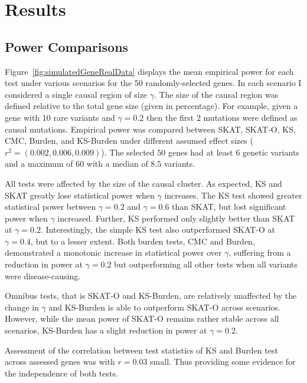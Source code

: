 \section{Results}
\label{sec:results_ksburden}

\subsection{Power Comparisons}
\label{sub:power_comparisons}

Figure~\ref{fig:simulatedGeneRealData} displays the mean empirical power for each test under various scenarios for the 50 randomly-selected genes.
In each scenario I considered a single causal region of size $\gamma$.
The size of the causal region was defined relative to the total gene size (given in percentage).
For example, given a gene with 10 rare variants and $\gamma=0.2$ then the first $2$ mutations were defined as causal mutations.
Empirical power was compared between SKAT, SKAT-O, KS, CMC, Burden, and KS-Burden under different assumed effect sizes ($r^2=(0.002, 0.006, 0.009)$).
The selected $50$ genes had at least $6$ genetic variants and a maximum of $60$ with a median of $8.5$ variants.

All tests were affected by the size of the causal cluster.
As expected, KS and SKAT greatly lose statistical power when $\gamma$ increases.
The KS test showed greater statistical power between $\gamma=0.2$ and $\gamma=0.6$ than SKAT, but lost significant power when $\gamma$ increased.
Further, KS performed only slightly better than SKAT at $\gamma=0.2$.
Interestingly, the simple KS test also outperformed SKAT-O at $\gamma=0.4$, but to a lesser extent.
Both burden tests, CMC and Burden, demonstrated a monotonic increase in statistical power over $\gamma$,
 suffering from a reduction in power at $\gamma=0.2$ but outperforming all other tests when all variants were disease-causing.

Omnibus tests, that is SKAT-O and KS-Burden, are relatively unaffected by the change in $\gamma$ and KS-Burden is able to outperform SKAT-O across scenarios.
However, while the mean power of SKAT-O remains rather stable across all scenarios, KS-Burden has a slight reduction in power at $\gamma=0.2$.

Assessment of the correlation between test statistics of KS and Burden test across assessed genes was with $r=0.03$ small.
Thus providing some evidence for the independence of both tests. %

